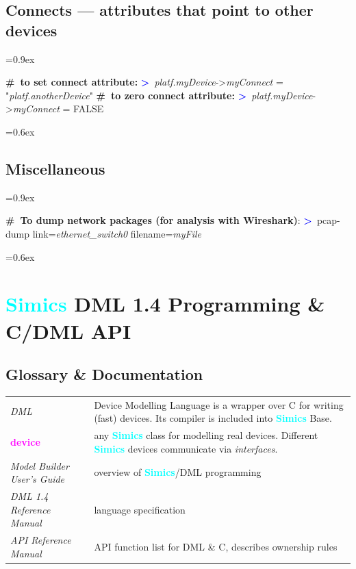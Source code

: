 \documentclass[8pt]{extarticle}
\newenvironment{code}[1][]{%
\begin{prebox}[#1]\obeylines%
\fontdimen2\font=0.9ex%
}{%
\end{prebox}%
\fontdimen2\font=0.6ex%
}
\newcommand{\sprompt}{\textcolor{blue}{\textbf{>}\ }}
\newcommand{\kw}[1]{\textcolor{magenta}{\textbf{#1}}}
\newcommand{\cmtcommon}[1]{\textcolor{Sepia}{\textbf{#1}}}
\newcommand{\cmt}[1]{\cmtcommon{\#\ #1}}
\newcommand{\p}[1]{\textit{\large#1}}
\newcommand{\Simics}{\textcolor{cyan}{\textbf{Simics}}}
\newlength{\MyLen}
\begin{document}
\begin{multicols*}{3}

\subsection{Connects — attributes that point to other devices}

\begin{code}
    \cmt{to set connect attribute:}
    \sprompt \p{platf.myDevice}->\p{myConnect} = "\p{platf.anotherDevice}"
    \cmt{to zero connect attribute:}
    \sprompt \p{platf.myDevice}->\p{myConnect} = FALSE
\end{code}

\subsection{Miscellaneous}
\begin{code}
    \cmt{To dump network packages (for analysis with Wireshark)}:
    \sprompt pcap-dump link=\p{ethernet_switch0} filename=\p{myFile}
\end{code}

\newpage

\section{\Simics{} DML 1.4 Programming \& C/DML API}

\subsection{Glossary \& Documentation}
    \begin{tabular}{p{\the\MyLen}p{\linewidth-\the\MyLen-0.8cm}}
        \textit{DML}         & Device Modelling Language is a
        wrapper over C for writing (fast) devices.
        Its compiler is included into \Simics{} Base.
        \\
        \kw{device}          & any \Simics{} class for modelling real
        devices. Different \Simics{} devices communicate via \textit{interfaces}.
        \\
        \textit{Model Builder User’s Guide} & overview of \Simics{}/DML
        programming \\
        \textit{DML 1.4 Reference Manual} & language specification \\
        \textit{API Reference Manual} & API function list for DML \& C,
        describes ownership rules
    \end{tabular}


\end{multicols*}
\end{document}
